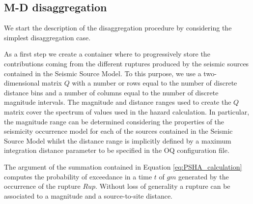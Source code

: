 \subsection{M-D disaggregation}
We start the description of the disaggregation procedure by considering the  simplest disaggregation case. 

As a first step we create a container where to progressively store the contributions coming from the different ruptures produced by the seismic sources contained in the Seismic Source Model.
%
To this purpose, we use a two-dimensional matrix $Q$ with a number or rows equal to the number of discrete distance bins and a number of columns equal to the number of discrete magnitude intervals. The magnitude and distance ranges used to create the $Q$ matrix cover the spectrum of values used in the hazard calculation. In particular, the magnitude range can be determined considering the properties of the seismicity occurrence model for each of the sources contained in the Seismic Source Model whilst the distance range is implicitly defined by a maximum integration distance parameter to be specified in the OQ configuration file. 
%

The argument of the summation contained in Equation \ref{eq:PSHA_calculation} computes the probability of exceedance in a time $t$ of $gm$ generated by the occurrence of the rupture $Rup$. Without loss of generality a rupture can be associated to a magnitude and a source-to-site distance.



